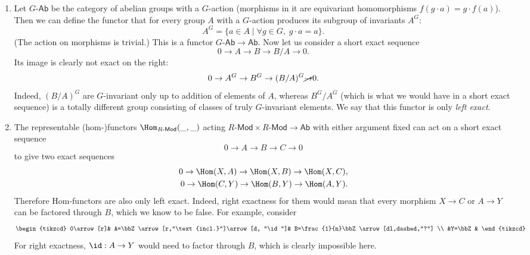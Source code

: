 \begin{example}
    \begin{enumerate}
        \item Let $G\text{-}\mathsf{Ab}$ be the category of abelian groups with a $G$-action (morphisms in it are equivariant homomorphisms $f(g\cdot a)=g\cdot f(a)$). Then we can define the functor that for every group $A$ with a $G$-action produces its subgroup of invariants $A^G$:
        \[A^G=\{a\in A\mid \forall g\in G,\; g\cdot a=a\}.\]
        (The action on morphisms is trivial.) This is a functor $G\text{-}\mathsf{Ab}\to\mathsf{Ab}$. Now let us consider a short exact sequence
        \[0\to A\to B\to B/A\to 0.\]
        Its image is clearly not exact on the right:
        \[0\to A^G\to B^G\to (B/A)^G \cancel{\to} 0.\]
        Indeed, $(B/A)^G$ are $G$-invariant only up to addition of elements of $A$, whereas $B^G/A^G$ (which is what we would have in a short exact sequence) is a totally different group consisting of classes of truly $G$-invariant elements. We say that this functor is only \emph{left exact}.
        \item The representable (hom-)functors $\Hom_{R\text{-}\mathsf{Mod}}(\_,\_)$ acting $R\text{-}\mathsf{Mod}\times R\text{-}\mathsf{Mod}\to \mathsf{Ab}$ with either argument fixed can act on a short exact sequence 
        \[0\to A\to B\to C\to 0\]
        to give two exact sequences
        \begin{eqnarray}
            0\to \Hom(X,A)\to \Hom(X,B)\to \Hom(X,C),\\
            0\to \Hom(C,Y)\to \Hom(B,Y)\to \Hom(A,Y).
        \end{eqnarray}
        Therefore Hom-functors are also only left exact. Indeed, right exactness for them would mean that every morphism $X\to C$ or $A\to Y$ can be factored through $B$, which we know to be false. For example, consider
        \[\begin{tikzcd}
        0\arrow[r]& A=\bbZ\arrow[r,"\text{incl.}"]\arrow[d,
        "\id"]& B=\frac{1}{n}\bbZ\arrow[dl,dashed,"?"] \\
         &Y=\bbZ &
        \end{tikzcd}\]
        For right exactness, $\id:A\to Y$ would need to factor through $B$, which is clearly impossible here.
        

\end{enumerate}
\end{example}
